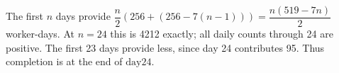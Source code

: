 The first $n$ days provide $\dfrac{n}{2}(256+(256-7(n-1)))=\dfrac{n(519-7n)}{2}$ worker-days. At $n=24$ this is 4212 exactly; all daily counts through 24 are positive. The first 23 days provide less, since day 24 contributes 95. Thus completion is at the end of $\boxed{\text{day24}}$.
